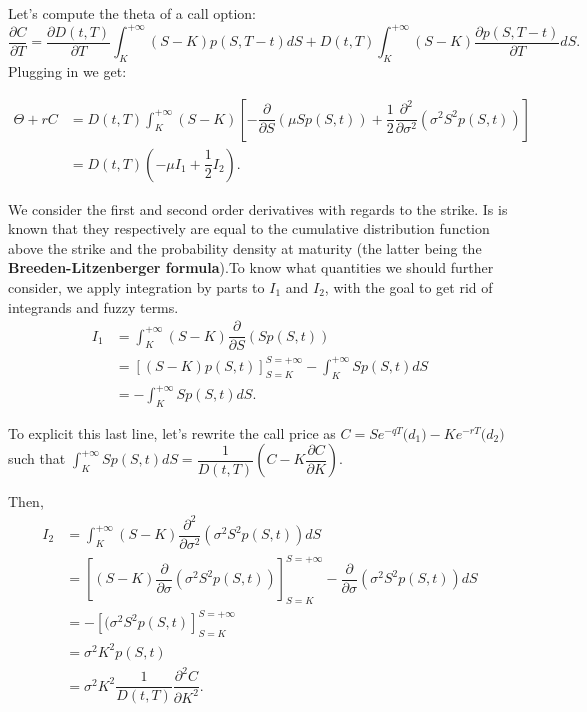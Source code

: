 Let's compute the theta of a call option: $$\dfrac{\partial C}{\partial T} = \dfrac{\partial D(t,T)}{\partial T} \displaystyle \int_K^{+\infty} (S - K)p(S, T-t)dS + D(t,T)\int_K^{+\infty} (S - K)\dfrac{\partial p(S, T-t)}{\partial T}dS.$$ Plugging in we get:

\begin{align*}
    \Theta + rC &= D(t,T)\displaystyle \int_{K}^{+\infty} (S-K) \left[-\dfrac{\partial}{\partial S}(\mu Sp(S,t)) + \dfrac{1}{2} \dfrac{\partial^2}{\partial \sigma^2}(\sigma^2 S^2 p(S,t))\right]\\
    &= D(t,T)\left(-\mu I_1 + \dfrac{1}{2}I_2\right).
\end{align*}

We consider the first and second order derivatives with regards to the strike. Is is known that they respectively are equal to the cumulative distribution function above the strike and the probability density at maturity (the latter being the \textbf{Breeden-Litzenberger formula}).\newline To know what quantities we should further consider, we apply integration by parts to $I_1$ and $I_2$, with the goal to get rid of integrands and fuzzy terms.\\

\begin{align*}
    I_1 &= \displaystyle \int_{K}^{+\infty} (S-K) \dfrac{\partial}{\partial S}(Sp(S,t))\\
    &= \left[(S - K)p(S,t)\right]_{S=K}^{S=+\infty} - \displaystyle \int_K^{+\infty} S p(S,t)dS\\
    &= - \displaystyle \int_K^{+\infty} S p(S,t)dS.
\end{align*}

To explicit this last line, let's rewrite the call price as $C = Se^{-qT} \mathcal(d_1) - K e^{-rT} \mathcal(d_2)$ such that $\displaystyle \int_K^{+\infty} S p(S,t)dS = \dfrac{1}{D(t,T)}\left(C - K \dfrac{\partial C}{\partial K}\right)$.

Then, 
\begin{align*}
    I_2 &= \displaystyle \int_{K}^{+\infty} (S-K) \dfrac{\partial^2}{\partial \sigma^2}(\sigma^2 S^2 p(S,t))dS\\
    &= \left[(S - K)\dfrac{\partial}{\partial \sigma}(\sigma^2 S^2 p(S,t))\right]_{S=K}^{S=+\infty} - \displaystyle \dfrac{\partial}{\partial \sigma}(\sigma^2 S^2 p(S,t))dS\\
    &= - \left[(\sigma^2 S^2 p(S,t)\right]_{S=K}^{S=+\infty}\\
    &= \sigma^2 K^2 p(S,t)\\
    &= \sigma^2 K^2 \dfrac{1}{D(t,T)} \dfrac{\partial^2 C}{\partial K^2}.
\end{align*}

